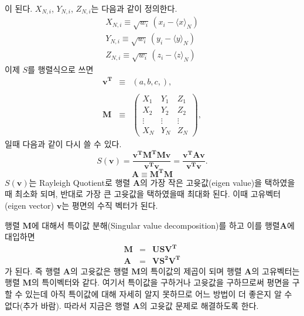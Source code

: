 \documentclass[chapter,a4paper,12pt]{oblivoir}
\begin{document}
이 된다. $X_{N,i}$, $Y_{N,i}$, $Z_{N,i}$는 다음과 같이 정의한다.
\begin{eqnarray}
X_{N,i} \equiv \sqrt{w_i}\,(x_i - \langle x \rangle_N)\\
Y_{N,i} \equiv \sqrt{w_i}\,(y_i - \langle y \rangle_N)\\
Z_{N,i} \equiv \sqrt{w_i}\,(z_i - \langle z \rangle_N)
\end{eqnarray}
이제 $S$를 행렬식으로 쓰면
\begin{eqnarray}
\mathbf{v^T} &\equiv& (a,b,c,), \\\nonumber\\
\mathbf{M}   &\equiv& \left( \begin{array}{ccc}
  X_1 & Y_1 & Z_1 \\
  X_2 & Y_2 & Z_2 \\
  \vdots & \vdots & \vdots \\
  X_N & Y_N & Z_N 
\end{array} \right),
\end{eqnarray}
일때 다음과 같이 다시 쓸 수 있다.
\begin{equation}
S(\mathbf v) = \frac{\mathbf{v^T}\mathbf{M^T}\mathbf{M}\mathbf{v}}{\mathbf{v^T}\mathbf{v}}
             = \frac{\mathbf{v^T}\mathbf{A}\mathbf{v}}{\mathbf{v^T}\mathbf{v}}.
\end{equation}
\begin{equation}
\mathbf{A}\equiv\mathbf{M^T}\mathbf{M}
\end{equation}
$S(\mathbf{v})$는 Rayleigh Quotient로 행렬 $\mathbf{A}$의 
가장 작은 고윳값(eigen value)을 택하였을때 최소화 되며, 반대로 가장 큰 고윳값을 택하였을때 최대화 된다.
이때 고유벡터(eigen vector) $\mathbf v$는 평면의 수직 벡터가 된다.

행렬 $\mathbf{M}$에 대해서 특이값 분해(Singular value decomposition)를 하고 이를 행렬$\mathbf{A}$에
대입하면
\begin{eqnarray}
\mathbf{M}&=&\mathbf{U}\mathbf{S}\mathbf{V^T} \\
\mathbf{A}&=&\mathbf{V}\mathbf{S^2}\mathbf{V^T} \label{def_A}
\end{eqnarray}
가 된다. 즉 행렬 $\mathbf{A}$의 고윳값은 행렬 $\mathbf{M}$의 특이값의 제곱이 되며 
행렬 $\mathbf{A}$의 고유벡터는 행렬 $\mathbf{M}$의 특이벡터와 같다.
여기서 특이값을 구하거나 고윳값을 구하므로써 평면을 구할 수 있는데 아직 특이값에 대해 자세히 알지 못하므로
어느 방법이 더 좋은지 알 수 없다(추가 바람).
따라서 지금은 행렬 $\mathbf{A}$의 고윳값 문제로 해결하도록 한다.
\end{document}
